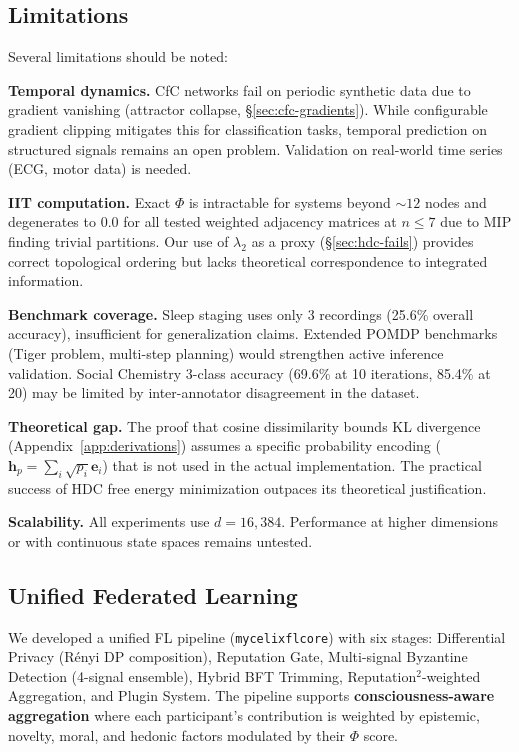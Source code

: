 \documentclass[10pt,letterpaper]{article}
\renewcommand{\Phi}{\varPhi}
\begin{document}
\subsection{Limitations}
\label{sec:limitations}

Several limitations should be noted:

\textbf{Temporal dynamics.} CfC networks fail on periodic synthetic data due to gradient vanishing (attractor collapse, \S\ref{sec:cfc-gradients}). While configurable gradient clipping mitigates this for classification tasks, temporal prediction on structured signals remains an open problem. Validation on real-world time series (ECG, motor data) is needed.

\textbf{IIT computation.} Exact $\Phi$ is intractable for systems beyond ${\sim}12$ nodes and degenerates to 0.0 for all tested weighted adjacency matrices at $n \leq 7$ due to MIP finding trivial partitions. Our use of $\lambda_2$ as a proxy (\S\ref{sec:hdc-fails}) provides correct topological ordering but lacks theoretical correspondence to integrated information.

\textbf{Benchmark coverage.} Sleep staging uses only 3 recordings (25.6\% overall accuracy), insufficient for generalization claims. Extended POMDP benchmarks (Tiger problem, multi-step planning) would strengthen active inference validation. Social Chemistry 3-class accuracy (69.6\% at 10 iterations, 85.4\% at 20) may be limited by inter-annotator disagreement in the dataset.

\textbf{Theoretical gap.} The proof that cosine dissimilarity bounds KL divergence (Appendix~\ref{app:derivations}) assumes a specific probability encoding ($\mathbf{h}_p = \sum_i \sqrt{p_i} \mathbf{e}_i$) that is not used in the actual implementation. The practical success of HDC free energy minimization outpaces its theoretical justification.

\textbf{Scalability.} All experiments use $d = 16{,}384$. Performance at higher dimensions or with continuous state spaces remains untested.

\subsection{Unified Federated Learning}
\label{sec:fl}

We developed a unified FL pipeline (\texttt{mycelix\-fl\-core}) with six stages: Differential Privacy (R\'{e}nyi DP composition), Reputation Gate, Multi-signal Byzantine Detection (4-signal ensemble), Hybrid BFT Trimming, Reputation$^2$-weighted Aggregation, and Plugin System. The pipeline supports \textbf{consciousness-aware aggregation} where each participant's contribution is weighted by epistemic, novelty, moral, and hedonic factors modulated by their $\Phi$ score.
\end{document}
